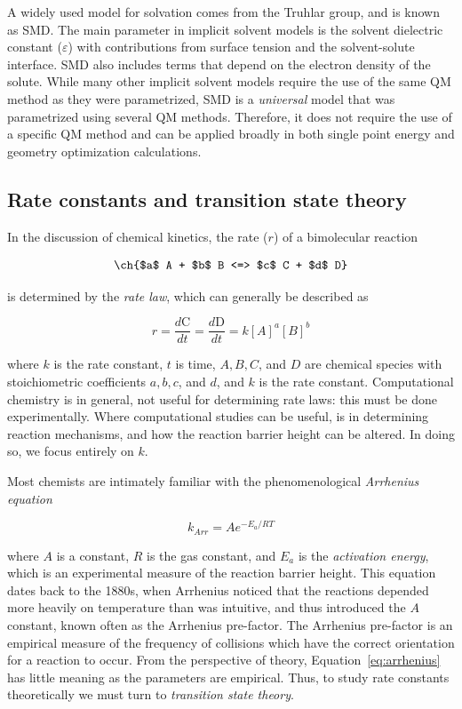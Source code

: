 \begin{doublespace}
A widely used model for solvation comes from the Truhlar group, and is known as
SMD.\cite{Marenich2009} The main parameter in implicit solvent models is the
solvent dielectric constant ($\varepsilon$) with contributions from surface
tension and the solvent-solute interface. SMD also includes terms that depend
on the electron density of the solute.  While many other implicit solvent
models require the use of the same QM method as they were
parametrized,\cite{Ho2010} SMD is a \emph{universal} model that was
parametrized using several QM methods. Therefore, it does not require the use
of a specific QM method and can be applied broadly in both single point energy
and geometry optimization calculations.

\subsection{Rate constants and transition state theory}

In the discussion of chemical kinetics, the rate ($r$) of a bimolecular
reaction

\begin{equation}
  \ch{$a$ A + $b$ B <=> $c$ C + $d$ D}
  \label{eq:a}
\end{equation}

\noindent is determined by the \emph{rate law}, which can generally be
described as

\begin{equation}
  r = \frac{d \text{C}}{dt} =\frac{d \text{D}}{dt} = k[A]^a [B]^b
\end{equation}

\noindent where $k$ is the rate constant, $t$ is time, $A, B, C$, and $D$ are
chemical species with stoichiometric coefficients $a, b, c$, and $d$, and $k$
is the rate constant. Computational chemistry is in general, not useful for
determining rate laws: this must be done experimentally. Where computational
studies can be useful, is in determining reaction mechanisms, and how the
reaction barrier height can be altered. In doing so, we focus entirely on $k$.

Most chemists are intimately familiar with the phenomenological \emph{Arrhenius
equation}

\begin{equation}
  k_{Arr} = Ae^{-E_a/RT}
\label{eq:arrhenius}
\end{equation}

\noindent where $A$ is a constant, $R$ is the gas constant, and $E_a$ is the
\emph{activation energy}, which is an experimental measure of the reaction
barrier height. This equation dates back to the 1880s, when Arrhenius noticed
that the reactions depended more heavily on temperature than was intuitive, and
thus introduced the $A$ constant, known often as the Arrhenius
pre-factor.\cite{McQuarrie1997} The Arrhenius pre-factor is an empirical measure
of the frequency of collisions which have the correct orientation for a reaction
to occur. From the perspective of theory, Equation~\ref{eq:arrhenius} has little
meaning as the parameters are empirical. Thus, to study rate constants
theoretically we must turn to \emph{transition state theory}.


\end{doublespace}
